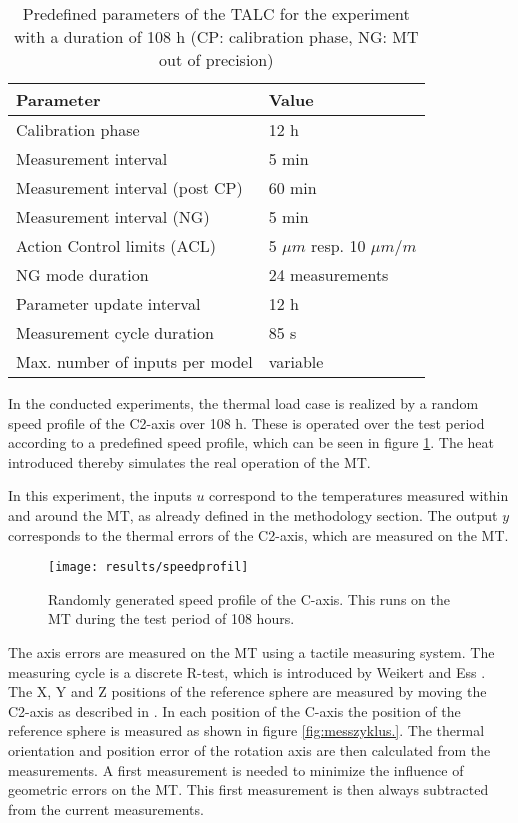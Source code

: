 \begin{table}[!htb]
\centering
\begin{threeparttable}
\caption[Experiment parameters]{Predefined parameters of the TALC for the experiment with a duration of 108 h (CP: calibration phase, NG: MT out of precision)}
\begin{tabular}{l l}
\hline
Parameter \hspace{7cm} & Value\\
  \hline
 Calibration phase & 12 h\\
 Measurement interval & 5 min\\
 Measurement interval (post CP) & 60 min\\
 Measurement interval (NG) & 5 min\\
 Action Control limits (ACL) & 5 $\mu m$ resp. 10 $\mu m/m$\\
 NG mode duration & 24 measurements\\
 Parameter update interval & 12 h\\
 Measurement cycle duration & 85 s\\
 Max. number of inputs per model & variable\\
\hline
\end{tabular}
\label{Tab:Experimental_setup}
\end{threeparttable}
\end{table}


In the conducted experiments, the thermal load case is realized by a random speed profile of the C2-axis over 108 h. These is operated over the test period according to a predefined speed profile, which can be seen in figure \ref{fig:speedprofil}. The heat introduced thereby simulates the real operation of the MT.

In this experiment, the inputs $u$ correspond to the temperatures measured within and around the MT, as already defined in the methodology section. The output $y$ corresponds to the thermal errors of the C2-axis, which are measured on the MT.


\begin{figure}[!htb]
    \centering
    \texttt{[image: results/speedprofil]} %
    \caption[Speed profile]{Randomly generated speed profile of the C-axis. This runs on the MT during the test period of 108 hours.}
    \label{fig:speedprofil}
\end{figure}

The axis errors are measured on the MT using a tactile measuring system. The measuring cycle is a discrete R-test, which is introduced by Weikert \cite{Weikert2004} and Ess \cite{Ess2011}. The X, Y and Z positions of the reference sphere are measured by moving the C2-axis as described in \cite{Blaser2014}. In each position of the C-axis the position of the reference sphere is measured as shown in figure \ref{fig:messzyklus.}. The thermal orientation and position error of the rotation axis are then calculated from the measurements. A first measurement is needed to minimize the influence of geometric errors on the MT. This first measurement is then always subtracted from the current measurements.

